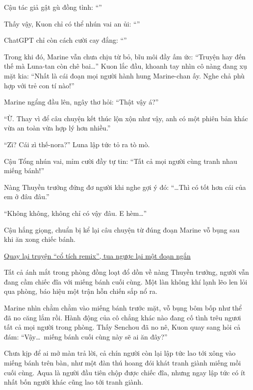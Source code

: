 \documentclass[../main.tex]{subfiles}
\begin{document}
Cậu tác giả gật gù đồng tình: ``''

Thấy vậy, Kuon chỉ có thể nhún vai an ủi: ``''

ChatGPT chỉ còn cách cười cay đắng: ``''

\il

Trong khi đó, Marine vẫn chưa chịu từ bỏ, bĩu môi đầy ấm ức: ``Truyện hay đến thế mà Luna-tan còn chê bai\dots'' Kuon lắc đầu, khoanh tay nhìn cô nàng đang xụ mặt kia: ``Nhất là cái đoạn mọi người hành hung Marine-chan ấy. Nghe chả phù hợp với trẻ con tí nào!''

Marine ngẩng đầu lên, ngây thơ hỏi: ``Thật vậy á?''

``Ừ. Thay vì để câu chuyện kết thúc lộn xộn như vậy, anh có một phiên bản khác vừa an toàn vừa hợp lý hơn nhiều.''

``Zì? Cái zì thế-nora?'' Luna lập tức tỏ ra tò mò.

Cậu Tổng nhún vai, mỉm cười đầy tự tin: ``Tất cả mọi người cùng tranh nhau miếng bánh!''

Nàng Thuyền trưởng đứng đơ người khi nghe gợi ý đó: ``\dots Thì có tốt hơn cái của em ở đâu đâu.''

``Không không, không chỉ có vậy đâu. E hèm\dots''

Cậu hắng giọng, chuẩn bị kể lại câu chuyện từ đúng đoạn Marine vỗ bụng sau khi ăn xong chiếc bánh.

\begin{center}
  \uline{Quay lại truyện ``cổ tích remix'', tua ngược lại một đoạn ngắn}
\end{center}

Tất cả ánh mắt trong phòng đồng loạt đổ dồn về nàng Thuyền trưởng, người vẫn đang cầm chiếc đĩa với miếng bánh cuối cùng. Một làn không khí lạnh lẽo len lỏi qua phòng, báo hiệu một trận hỗn chiến sắp nổ ra.

Marine nhìn chằm chằm vào miếng bánh trước mặt, vỗ bụng bôm bốp như thể đã no căng lắm rồi. Hành động của cô chẳng khác nào đang cố tình trêu ngươi tất cả mọi người trong phòng. Thấy Senchou đã no nê, Kuon quay sang hỏi cả đám: ``Vậy\dots\ miếng bánh cuối cùng này sẽ ai ăn đây?''

Chưa kịp để ai mở màn trả lời, cả chín người còn lại lập tức lao tới xông vào miếng bánh trên bàn, như một đàn thú hoang đói khát tranh giành miếng mồi cuối cùng. Aqua là người đầu tiên chộp được chiếc đĩa, nhưng ngay lập tức có ít nhất bốn người khác cũng lao tới tranh giành.
\end{document}
